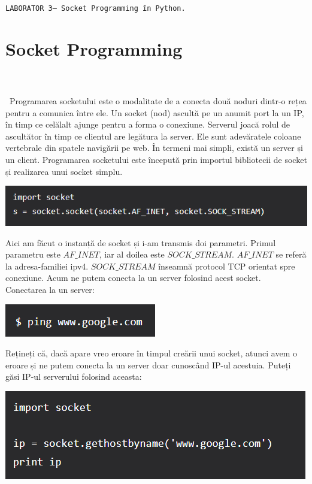\documentclass[oneside,20pt]{article}          %
\begin{document}

\noindent 
\begin{center}
  \texttt{LABORATOR 3-- Socket Programming în Python.}        
\end{center}

\section{Socket Programming}
\noindent                 
\\\\\
Programarea socketului este o modalitate de a conecta două noduri dintr-o rețea pentru a comunica între ele. Un socket (nod) ascultă pe un anumit port la un IP, în timp ce celălalt ajunge pentru a forma o conexiune. Serverul joacă rolul de ascultător în timp ce clientul are legătura la server.
Ele sunt adevăratele coloane vertebrale din spatele navigării pe web. În termeni mai simpli, există un server și un client.
Programarea socketului este începută prin importul bibliotecii de socket și realizarea unui socket simplu.

\begin{center}
\includegraphics[height = 1 cm]{0.png}
\end{center}

Aici am făcut o instanță de socket și i-am transmis doi parametri. Primul parametru este $AF\_INET$, iar al doilea este $SOCK\_STREAM$. $AF\_INET$ se referă la adresa-familiei ipv4. $SOCK\_STREAM$ înseamnă protocol TCP orientat spre conexiune.
Acum ne putem conecta la un server folosind acest socket.\\
Conectarea la un server:\\

\begin{center}
\includegraphics[height = 1 cm]{0.1.png}
\end{center}
Rețineți că, dacă apare vreo eroare în timpul creării unui socket, atunci avem o eroare și ne putem conecta la un server doar cunoscând IP-ul acestuia. Puteți găsi IP-ul serverului folosind aceasta:


\begin{center}
\includegraphics[height = 2 cm]{0.2.png}
\end{center}
\end{document}
